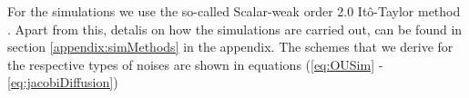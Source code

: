 For the simulations we use the so-called Scalar-weak order 2.0 Itô-Taylor method \cite[algorithm 8.5]{Srkk2019}. Apart from this, detalis on how the simulations are carried out, can be found in section \ref{appendix:simMethods} in the appendix. The schemes that we derive for the respective types of noises are shown in equations (\ref{eq:OUSim} - \ref{eq:jacobiDiffusion})